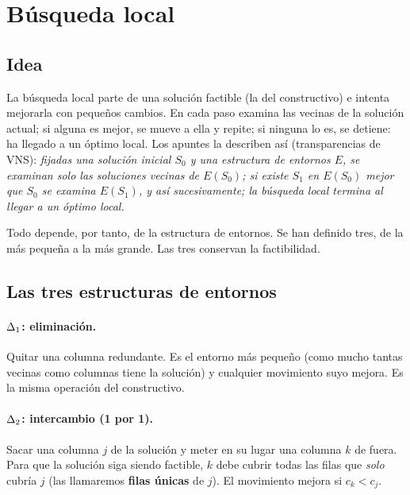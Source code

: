 \section{Búsqueda local}\label{sec:local}

\subsection{Idea}

La búsqueda local parte de una solución factible (la del constructivo) e intenta mejorarla
con pequeños cambios. En cada paso examina las vecinas de la solución actual; si alguna es
mejor, se mueve a ella y repite; si ninguna lo es, se detiene: ha llegado a un óptimo local.
Los apuntes la describen así (transparencias de VNS): \emph{fijadas una solución inicial
$S_0$ y una estructura de entornos $E$, se examinan solo las soluciones vecinas de $E(S_0)$;
si existe $S_1$ en $E(S_0)$ mejor que $S_0$ se examina $E(S_1)$, y así sucesivamente; la
búsqueda local termina al llegar a un óptimo local.}

Todo depende, por tanto, de la estructura de entornos. Se han definido tres, de la más
pequeña a la más grande. Las tres conservan la factibilidad.

\subsection{Las tres estructuras de entornos}\label{sec:entornos}

\paragraph{$\Delta_{1}$: eliminación.} Quitar una columna redundante. Es el entorno más pequeño
(como mucho tantas vecinas como columnas tiene la solución) y cualquier movimiento suyo
mejora. Es la misma operación  del constructivo.

\paragraph{$\Delta_{2}$: intercambio (1 por 1).} Sacar una columna $j$ de la solución y meter en su
lugar una columna $k$ de fuera. Para que la solución siga siendo factible, $k$ debe cubrir
todas las filas que \emph{solo} cubría $j$ (las llamaremos \textbf{filas únicas} de $j$). El
movimiento mejora si $c_k<c_j$.


